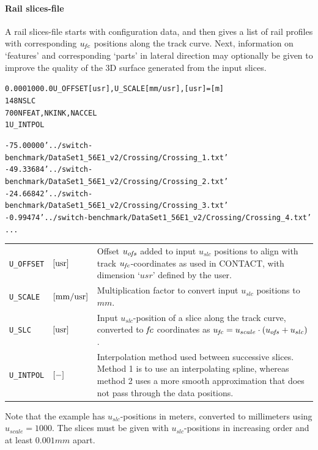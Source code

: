 \documentclass[12pt]{report}
\renewcommand{\magenta}[1]{}
\newenvironment{inputvars}{\vspace{0.4\baselineskip}%

\begin{tabular}{>{\raggedright}p{22mm}p{19mm}p{113mm}}}{
\end{tabular}

}
\newcommand{\inpvar}[3]{{\small\tt #1} & $#2$ & #3 \\[1ex]}
\begin{document}
\paragraph{Rail slices-file}

A rail slices-file starts with configuration data, and then gives a list of
rail profiles with corresponding $u_{\mkern-2muf\mkern-2muc}$ positions along the track curve.
Next, information on `features' and corresponding `parts' in lateral
direction may optionally be given to improve the quality of the 3D surface
generated from the input slices. 
\magenta{Lastly, perturbations may be prescribed to be added to the
surface, used primarily to describe rail corrugation and wheel
polygonization.}
\begin{alltt}\small

   0.000    1000.0   U_OFFSET [usr], U_SCALE [mm/usr], [usr] = [m]
     148             NSLC
       7    0    0   NFEAT, NKINK, NACCEL
       1    \magenta{0}         U_INTPOL\magenta{, PERTURB}


 -75.00000   '../switch-benchmark/DataSet1_56E1_v2/Crossing/Crossing_1.txt'
 -49.33684   '../switch-benchmark/DataSet1_56E1_v2/Crossing/Crossing_2.txt'
 -24.66842   '../switch-benchmark/DataSet1_56E1_v2/Crossing/Crossing_3.txt'
  -0.99474   '../switch-benchmark/DataSet1_56E1_v2/Crossing/Crossing_4.txt'
          ...
\end{alltt}
\begin{inputvars}
\inpvar{U\_OFFSET}{\bunit{usr}}{Offset $u_{o\mkern-2muf\mkern-2mus}$ added to input $u_{slc}$
        positions to align with track $u_{\mkern-2muf\mkern-2muc}$-coordinates as used in
        CONTACT, with dimension `$\unit{usr}$' defined by the user.}
\inpvar{U\_SCALE}{\bunit{mm/usr}}{Multiplication factor to convert input
        $u_{slc}$ positions to $\unit{mm}$.}
\inpvar{U\_SLC}{\bunit{usr}}{Input $u_{slc}$-position of a slice along the
        track curve, converted to $\mkern-2muf\mkern-2muc$ coordinates as $u_{\mkern-2muf\mkern-2muc} = u_{scale}
        \cdot (u_{o\mkern-2muf\mkern-2mus} + u_{slc})$.}
\inpvar{U\_INTPOL}{\bunit{-}}{Interpolation method used between successive
        slices. Method 1 is to use an interpolating spline, whereas method
        2 uses a more smooth approximation that does not pass through the
        data positions.}
\end{inputvars}
Note that the example has $u_{slc}$-positions in meters, converted to
millimeters using $u_{scale}=1000$. The slices must be given with
$u_{slc}$-positions in increasing order and at least $0.001\unit{mm}$ apart.
\end{document}
